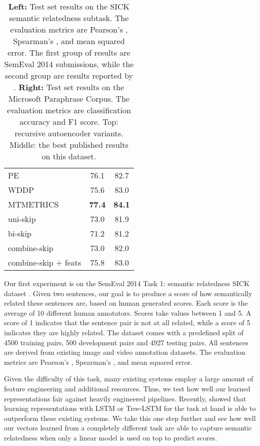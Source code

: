 \documentclass{article} \usepackage{nips15submit_e,times}
\begin{document}
\begin{table}
{\begin{tabular}{lcc}
PE \cite{das2009paraphrase}  & 76.1 & 82.7 \\ 
WDDP \cite{wan2006using} & 75.6 & 83.0 \\
MTMETRICS \cite{madnani2012re} & \textbf{77.4} & \textbf{84.1} \\ \midrule
uni-skip & 73.0 & 81.9  \\
bi-skip & 71.2 & 81.2  \\
combine-skip & 73.0 & 82.0 \\
combine-skip + feats & 75.8 & 83.0  \\ \bottomrule
\end{tabular}
}
\caption{{\bf Left:} Test set results on the SICK semantic relatedness subtask. The evaluation metrics are Pearson's , Spearman's , and mean squared error. The first group of results are SemEval 2014 submissions, while the second group are results reported by \cite{tai2015improved}. {\bf Right:} Test set results on the Microsoft Paraphrase Corpus. The evaluation metrics are classification accuracy and F1 score. Top: recursive autoencoder variants. Middle: the best published results on this dataset.}
\label{tab:semanticsim-results}
\end{table}

Our first experiment is on the SemEval 2014 Task 1: semantic relatedness SICK dataset \cite{marelli2014semeval}. Given two sentences, our goal is to produce a score of how semantically related these sentences are, based on human generated scores. Each score is the average of 10 different human annotators. Scores take values between 1 and 5. A score of 1 indicates that the sentence pair is not at all related, while a score of 5 indicates they are highly related. The dataset comes with a predefined split of 4500 training pairs, 500 development pairs and 4927 testing pairs. All sentences are derived from existing image and video annotation datasets. The evaluation metrics are Pearson's , Spearman's , and mean squared error.

Given the difficulty of this task, many existing systems employ a large amount of feature engineering and additional resources. Thus, we test how well our learned representations fair against heavily engineered pipelines. Recently, \cite{tai2015improved} showed that learning representations with LSTM or Tree-LSTM for the task at hand is able to outperform these existing systems. We take this one step further and see how well our vectors learned from a completely different task are able to capture semantic relatedness when only a linear model is used on top to predict scores.
\end{document}
